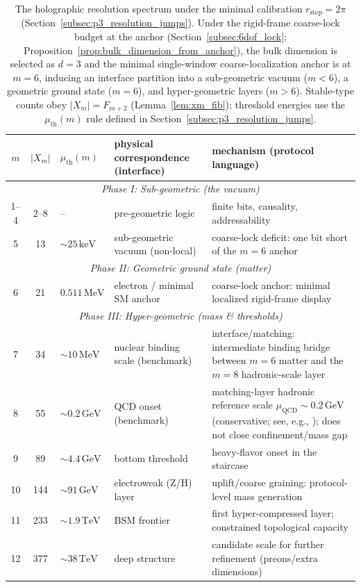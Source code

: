 \begin{table}[t]
\centering
\scriptsize
\setlength{\tabcolsep}{6pt}
\renewcommand{\arraystretch}{1.15}
\caption{The holographic resolution spectrum under the minimal calibration $r_{\mathrm{step}}=2\pi$ (Section~\ref{subsec:p3_resolution_jumps}). Under the rigid-frame coarse-lock budget at the anchor (Section~\ref{subsec:6dof_lock}; Proposition~\ref{prop:bulk_dimension_from_anchor}), the bulk dimension is selected as $d=3$ and the minimal single-window coarse-localization anchor is at $m=6$, inducing an interface partition into a sub-geometric vacuum ($m<6$), a geometric ground state ($m=6$), and hyper-geometric layers ($m>6$). Stable-type counts obey $|X_m|=F_{m+2}$ (Lemma~\ref{lem:xm_fib}); threshold energies use the $\mu_{\mathrm{th}}(m)$ rule defined in Section~\ref{subsec:p3_resolution_jumps}.}
\label{tab:resolution_spectrum}
\begin{tabular}{c c l >{\raggedright\arraybackslash}p{} >{\raggedright\arraybackslash}p{}}
\toprule
$m$ & $|X_m|$ & $\mu_{\mathrm{th}}(m)$ & physical correspondence (interface) & mechanism (protocol language) \\
\midrule
\multicolumn{5}{c}{\textit{Phase I: Sub-geometric (the vacuum)}} \\
1--4 & 2--8 & -- & pre-geometric logic & finite bits, causality, addressability \\
5 & 13 & $\sim 25\,\mathrm{keV}$ & sub-geometric vacuum (non-local) & coarse-lock deficit: one bit short of the $m=6$ anchor \\
\midrule
\multicolumn{5}{c}{\textit{Phase II: Geometric ground state (matter)}} \\
6 & 21 & $0.511\,\mathrm{MeV}$ & electron / minimal SM anchor & coarse-lock anchor: minimal localized rigid-frame display \\
\midrule
\multicolumn{5}{c}{\textit{Phase III: Hyper-geometric (mass \& thresholds)}} \\
7 & 34 & $\sim 10\,\mathrm{MeV}$ & nuclear binding scale (benchmark) & interface/matching: intermediate binding bridge between $m=6$ matter and the $m=8$ hadronic-scale layer \\
8 & 55 & $\sim 0.2\,\mathrm{GeV}$ & QCD onset (benchmark) & matching-layer hadronic reference scale $\mu_{\mathrm{QCD}}\sim 0.2\,\mathrm{GeV}$ (conservative; see, e.g., \cite{PDGRPP2024}); does not close confinement/mass gap \\
9 & 89 & $\sim 4.4\,\mathrm{GeV}$ & bottom threshold & heavy-flavor onset in the staircase \\
10 & 144 & $\sim 91\,\mathrm{GeV}$ & electroweak (Z/H) layer & uplift/coarse graining: protocol-level mass generation \\
11 & 233 & $\sim 1.9\,\mathrm{TeV}$ & BSM frontier & first hyper-compressed layer; constrained topological capacity \\
12 & 377 & $\sim 38\,\mathrm{TeV}$ & deep structure & candidate scale for further refinement (preons/extra dimensions) \\
\bottomrule
\end{tabular}
\end{table}
\FloatBarrier

